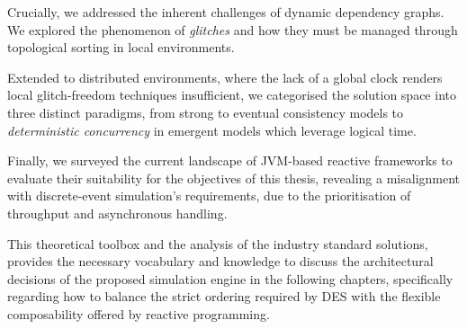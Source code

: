 Crucially, we addressed the inherent challenges of dynamic dependency graphs.
We explored the phenomenon of \emph{glitches} and how they must be managed
through topological sorting in local environments.

Extended to distributed environments, where the lack of a global clock renders
local glitch-freedom techniques insufficient, we categorised the solution space
into three distinct paradigms, from strong to eventual consistency models to
\emph{deterministic concurrency} in emergent models which leverage logical
time.

Finally, we surveyed the current landscape of \ac{JVM}-based reactive
frameworks to evaluate their suitability for the objectives of this thesis,
revealing a misalignment with discrete-event simulation's requirements, due to
the prioritisation of throughput and asynchronous handling.

This theoretical toolbox and the analysis of the industry standard solutions,
provides the necessary vocabulary and knowledge to discuss the architectural
decisions of the proposed simulation engine in the following chapters,
specifically regarding how to balance the strict ordering required by \ac{DES}
with the flexible composability offered by reactive programming.

